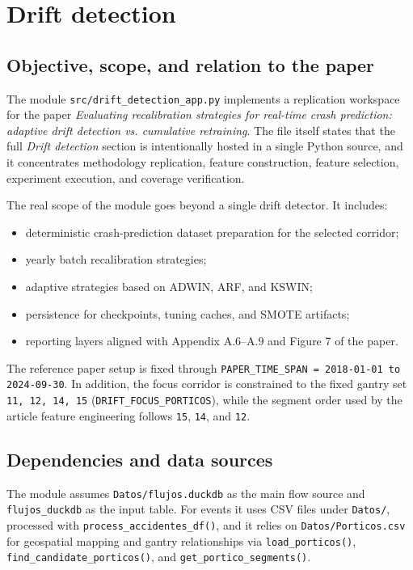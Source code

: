 \section{Drift detection}
\label{sec:drift-detection}

\subsection{Objective, scope, and relation to the paper}
The module \texttt{src/drift\_detection\_app.py} implements a replication workspace for the paper \textit{Evaluating recalibration strategies for real-time crash prediction: adaptive drift detection vs. cumulative retraining}. The file itself states that the full \textit{Drift detection} section is intentionally hosted in a single Python source, and it concentrates methodology replication, feature construction, feature selection, experiment execution, and coverage verification.

The real scope of the module goes beyond a single drift detector. It includes:
\begin{itemize}[leftmargin=*]
  \item deterministic crash-prediction dataset preparation for the selected corridor;
  \item yearly batch recalibration strategies;
  \item adaptive strategies based on ADWIN, ARF, and KSWIN;
  \item persistence for checkpoints, tuning caches, and SMOTE artifacts;
  \item reporting layers aligned with Appendix A.6--A.9 and Figure 7 of the paper.
\end{itemize}

The reference paper setup is fixed through \texttt{PAPER\_TIME\_SPAN = 2018-01-01 to 2024-09-30}. In addition, the focus corridor is constrained to the fixed gantry set \texttt{11, 12, 14, 15} (\texttt{DRIFT\_FOCUS\_PORTICOS}), while the segment order used by the article feature engineering follows \texttt{15}, \texttt{14}, and \texttt{12}.

\subsection{Dependencies and data sources}
The module assumes \texttt{Datos/flujos.duckdb} as the main flow source and \texttt{flujos\_duckdb} as the input table. For events it uses CSV files under \texttt{Datos/}, processed with \texttt{process\_accidentes\_df()}, and it relies on \texttt{Datos/Porticos.csv} for geospatial mapping and gantry relationships via \texttt{load\_porticos()}, \texttt{find\_candidate\_porticos()}, and \texttt{get\_portico\_segments()}.

